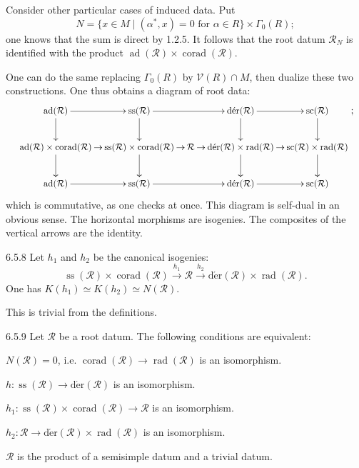  Consider other particular cases of induced data. Put
\[
N=\{x\in M\mid(\alpha^*,x)=0\text{ for }\alpha\in R\}\times\Gamma_0(R);
\]
one knows that the sum is direct by 1.2.5. It follows that the root datum $\mathcal R_N$ is identified with the product $\operatorname{ad}(\mathcal R)\times\operatorname{corad}(\mathcal R)$.

One can do the same replacing $\Gamma_0(R)$ by $\mathcal V(R)\cap M$, then dualize these two constructions. One thus obtains a diagram of root data:
\[
\resizebox{0.97\linewidth}{!}{$\xymatrix@C=0.8em{
\operatorname{ad}(\mathcal R)\ar[r]\ar[d]&\operatorname{ss}(\mathcal R)\ar[rr]\ar[d]&&\operatorname{d\acute er}(\mathcal R)\ar[r]\ar[d]&\operatorname{sc}(\mathcal R)\ar[d]\\
\operatorname{ad}(\mathcal R)\times\operatorname{corad}(\mathcal R)\ar[r]\ar[d]&\operatorname{ss}(\mathcal R)\times\operatorname{corad}(\mathcal R)\ar[r]\ar[d]&\mathcal R\ar[r]&\operatorname{d\acute er}(\mathcal R)\times\operatorname{rad}(\mathcal R)\ar[r]\ar[d]&\operatorname{sc}(\mathcal R)\times\operatorname{rad}(\mathcal R)\ar[d]\\
\operatorname{ad}(\mathcal R)\ar[r]&\operatorname{ss}(\mathcal R)\ar[rr]&&\operatorname{d\acute er}(\mathcal R)\ar[r]&\operatorname{sc}(\mathcal R)
}$};
\]
which is commutative, as one checks at once. This diagram is self-dual in an obvious sense. The horizontal morphisms are isogenies. The composites of the vertical arrows are the identity.
\begin{lemma}{6.5.8}\label{XXI.6.5.8}
Let $h_1$ and $h_2$ be the canonical isogenies:
\[
\operatorname{ss}(\mathcal R)\times\operatorname{corad}(\mathcal R)\xrightarrow{h_1}\mathcal R\xrightarrow{h_2}\operatorname{d\acute er}(\mathcal R)\times\operatorname{rad}(\mathcal R).
\]
One has $K(h_1)\simeq K(h_2)\simeq N(\mathcal R)$.
\end{lemma}
This is trivial from the definitions.
\begin{corollary}{6.5.9}\label{XXI.6.5.9}
Let $\mathcal R$ be a root datum. The following conditions are equivalent:
\begin{enumeratei}
\item $N(\mathcal R)=0$, i.e. $\operatorname{corad}(\mathcal R)\to\operatorname{rad}(\mathcal R)$ is an isomorphism.
\item $h:\operatorname{ss}(\mathcal R)\to\operatorname{d\acute er}(\mathcal R)$ is an isomorphism.
\item $h_1:\operatorname{ss}(\mathcal R)\times\operatorname{corad}(\mathcal R)\to\mathcal R$ is an isomorphism.
\item $h_2:\mathcal R\to\operatorname{d\acute er}(\mathcal R)\times\operatorname{rad}(\mathcal R)$ is an isomorphism.
\item $\mathcal R$ is the product of a semisimple datum and a trivial datum.
\end{enumeratei}
\end{corollary}
